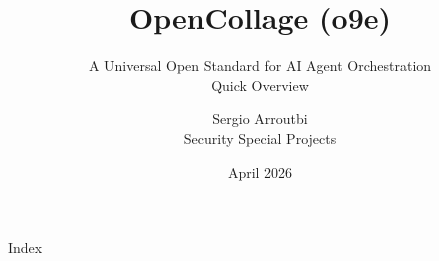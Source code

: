 \documentclass{beamer}
\title{OpenCollage (o9e)}
\subtitle{A Universal Open Standard for AI Agent Orchestration\\[4pt]
\normalsize Quick Overview}
\author{Sergio Arroutbi \\ Security Special Projects}
\date{April 2026}
\begin{document}
\begin{frame}
  \titlepage
\end{frame}

\begin{frame}{Index}
  \tiny
  \tableofcontents
\end{frame}












\end{document}
